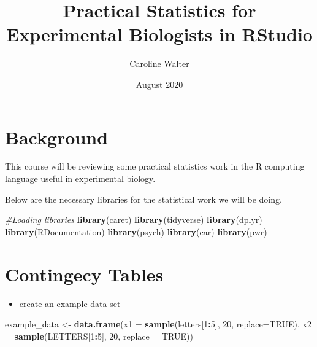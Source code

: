 \documentclass[
]{article}
\title{Practical Statistics for Experimental Biologists in RStudio}
\author{Caroline Walter}
\date{August 2020}
\newenvironment{Shaded}{\begin{snugshade}}{\end{snugshade}}
\newcommand{\CommentTok}[1]{\textcolor[rgb]{0.56,0.35,0.01}{\textit{#1}}}
\newcommand{\DataTypeTok}[1]{\textcolor[rgb]{0.13,0.29,0.53}{#1}}
\newcommand{\DecValTok}[1]{\textcolor[rgb]{0.00,0.00,0.81}{#1}}
\newcommand{\KeywordTok}[1]{\textcolor[rgb]{0.13,0.29,0.53}{\textbf{#1}}}
\newcommand{\NormalTok}[1]{#1}
\newcommand{\OperatorTok}[1]{\textcolor[rgb]{0.81,0.36,0.00}{\textbf{#1}}}
\newcommand{\OtherTok}[1]{\textcolor[rgb]{0.56,0.35,0.01}{#1}}
\newcommand{\StringTok}[1]{\textcolor[rgb]{0.31,0.60,0.02}{#1}}
\providecommand{\tightlist}{%
  \setlength{\itemsep}{0pt}\setlength{\parskip}{0pt}}
\begin{document}
\maketitle

{
\setcounter{tocdepth}{3}
\tableofcontents
}
\hypertarget{background}{%
\section{Background}\label{background}}

This course will be reviewing some practical statistics work in the R
computing language useful in experimental biology.

Below are the necessary libraries for the statistical work we will be
doing.

\begin{Shaded}
\begin{Highlighting}[]
\CommentTok{#Loading libraries}
\KeywordTok{library}\NormalTok{(caret)}
\KeywordTok{library}\NormalTok{(tidyverse)}
\KeywordTok{library}\NormalTok{(dplyr)}
\KeywordTok{library}\NormalTok{(RDocumentation)}
\KeywordTok{library}\NormalTok{(psych)}
\KeywordTok{library}\NormalTok{(car)}
\KeywordTok{library}\NormalTok{(pwr)}
\end{Highlighting}
\end{Shaded}

\hypertarget{contingecy-tables}{%
\section{Contingecy Tables}\label{contingecy-tables}}

\begin{itemize}
\tightlist
\item
  create an example data set
\end{itemize}

\begin{Shaded}
\begin{Highlighting}[]
\NormalTok{example_data <-}\StringTok{ }\KeywordTok{data.frame}\NormalTok{(}\DataTypeTok{x1 =} \KeywordTok{sample}\NormalTok{(letters[}\DecValTok{1}\OperatorTok{:}\DecValTok{5}\NormalTok{], }\DecValTok{20}\NormalTok{, }\DataTypeTok{replace=}\OtherTok{TRUE}\NormalTok{), }
                           \DataTypeTok{x2 =} \KeywordTok{sample}\NormalTok{(LETTERS[}\DecValTok{1}\OperatorTok{:}\DecValTok{5}\NormalTok{], }\DecValTok{20}\NormalTok{, }\DataTypeTok{replace =} \OtherTok{TRUE}\NormalTok{))}
\end{Highlighting}
\end{Shaded}
\end{document}
